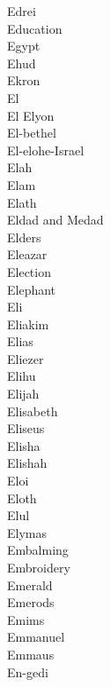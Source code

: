 Edrei  \\
Education  \\
Egypt  \\
Ehud  \\
Ekron  \\
El  \\
El Elyon  \\
El-bethel  \\
El-elohe-Israel  \\
Elah  \\
Elam  \\
Elath  \\
Eldad and Medad  \\
Elders  \\
Eleazar  \\
Election  \\
Elephant  \\
Eli  \\
Eliakim  \\
Elias  \\
Eliezer  \\
Elihu  \\
Elijah  \\
Elisabeth  \\
Eliseus  \\
Elisha  \\
Elishah  \\
Eloi  \\
Eloth  \\
Elul  \\
Elymas  \\
Embalming  \\
Embroidery  \\
Emerald  \\
Emerods  \\
Emims  \\
Emmanuel  \\
Emmaus  \\
En-gedi  \\
